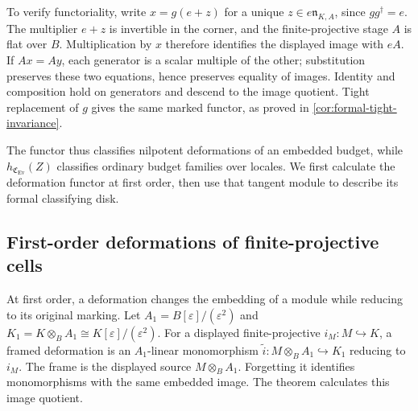 \documentclass[11pt,a4paper]{article}
\numberwithin{algorithm}{section}
\numberwithin{equation}{section}
\theoremstyle{definition}
\theoremstyle{remark}
\theoremstyle{plain}
\newcommand{\incl}{\hookrightarrow}
\newcommand{\eps}{\varepsilon}
\newcommand{\Ev}{{\operatorname{Ev}}}
\newcommand{\Cplx}{\mathfrak C_{\Ev}}
\theoremstyle{definition}
\theoremstyle{plain}
\begin{document}
To verify functoriality, write $x=g(e+z)$ for a unique
$z\in e\mathfrak n_{K,A}$, since $gg^\dagger=e$.
The multiplier $e+z$ is invertible in the corner, and the
finite-projective stage $A$ is flat over $B$.  Multiplication by
$x$ therefore identifies the displayed image with $eA$.  If $Ax=Ay$,
each generator is a scalar multiple of the other; substitution
preserves these two equations, hence preserves equality of images.
Identity and composition hold on generators and descend to the
image quotient.  Tight replacement of $g$ gives the same marked
functor, as proved in \cref{cor:formal-tight-invariance}.

The functor thus classifies nilpotent deformations of an embedded
budget, while $h_{\Cplx}(Z)$ classifies ordinary budget families
over locales. We first calculate the deformation functor at
first order, then use that tangent module to describe its
formal classifying disk.

\subsection{First-order deformations of finite-projective cells}
\label{sec:first-resource-deformations}
At first order, a deformation changes the embedding of a module
while reducing to its original marking.
Let $A_1=B[\eps]/(\eps^2)$ and
$K_1=K\otimes_BA_1\cong K[\eps]/(\eps^2)$.
For a displayed finite-projective $i_M:M\incl K$, a framed
deformation is an $A_1$-linear monomorphism
$\widetilde i:M\otimes_BA_1\incl K_1$ reducing to $i_M$.
The frame is the displayed source $M\otimes_BA_1$.
Forgetting it identifies monomorphisms with the same embedded
image. The theorem calculates this image quotient.
\end{document}
